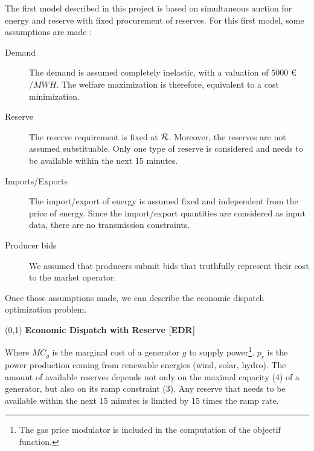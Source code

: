 The first model described in this project is based on simultaneous auction for energy and reserve with fixed procurement of reserves. 
For this first model, some assumptions are made :

\begin{description}
\item[Demand] The demand is assumed completely inelastic, with a valuation of $5000$ \euro $/MWH$. The welfare maximization is therefore, equivalent to a cost minimization.
\item[Reserve] The reserve requirement is fixed at $\mathcal{R}$. Moreover, the reserves are not assumed substituable. Only one type of reserve is considered and needs to be available within the next 15 minutes.
\item[Imports/Exports] The import/export of energy is assumed fixed and independent from the price of energy. Since the import/export quantities are considered as input data, there are no transmission constraints.
\item[Producer bids] We assumed that producers submit bids that truthfully represent their cost to the market operator.
\end{description}

Once those assumptions made, we can describe the economic dispatch optimization problem. \\

\begin{center}
\boxput*(0,1){\colorbox{white}{\textbf{ Economic Dispatch with Reserve [EDR]}}}{
\setlength{\fboxsep}{10pt}
}
\end{center} \vspace{0.5cm}

Where $MC_g$ is the marginal cost of a generator $g$ to supply power\footnote{The gas price modulator is included in the computation of the objectif function.}. $p_r$ is the power production coming from renewable energies (wind, solar, hydro). The amount of available reserves depends not only on the maximal capacity (4) of a generator, but also on its ramp constraint (3). Any reserve that needs to be available within the next 15 minutes is limited by 15 times the ramp rate. \newpage

